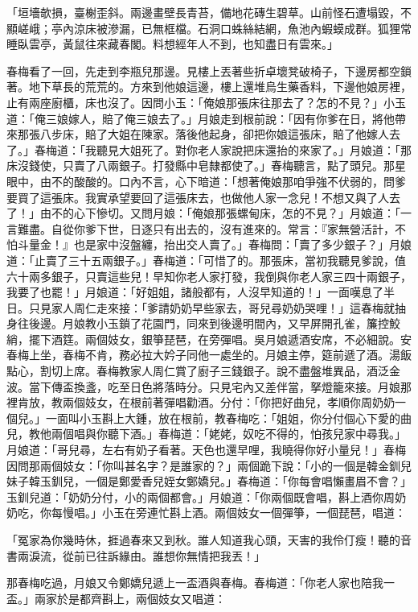 「垣墻欹損，臺榭歪斜。兩邊畫壁長青苔，備地花磚生碧草。山前怪石遭塌毀，不顯嵯峨；亭內涼床被滲漏，已無框檔。石洞口蛛絲結網，魚池內蝦蟆成群。狐狸常睡臥雲亭，黃鼠往來藏春閣。料想經年人不到，也知盡日有雲來。」

春梅看了一回，先走到李瓶兒那邊。見樓上丟著些折卓壞凳破椅子，下邊房都空鎖著。地下草長的荒荒的。方來到他娘這邊，樓上還堆烏生藥香料，下邊他娘房裡，止有兩座廚櫃，床也沒了。因問小玉：「俺娘那張床往那去了？怎的不見？」小玉道：「俺三娘嫁人，賠了俺三娘去了。」月娘走到根前說：「因有你爹在日，將他帶來那張八步床，賠了大姐在陳家。落後他起身，卻把你娘這張床，賠了他嫁人去了。」春梅道：「我聽見大姐死了。對你老人家說把床還抬的來家了。」月娘道：「那床沒錢使，只賣了八兩銀子。打發縣中皂隸都使了。」春梅聽言，點了頭兒。那星眼中，由不的酸酸的。口內不言，心下暗道：「想著俺娘那咱爭強不伏弱的，問爹要買了這張床。我實承望要回了這張床去，也做他人家一念兒！不想又與了人去了！」由不的心下慘切。又問月娘：「俺娘那張螺甸床，怎的不見？」月娘道：「一言難盡。自從你爹下世，日逐只有出去的，沒有進來的。常言：『家無營活計，不怕斗量金！』也是家中沒盤纏，抬出交人賣了。」春梅問：「賣了多少銀子？」月娘道：「止賣了三十五兩銀子。」春梅道：「可惜了的。那張床，當初我聽見爹說，值六十兩多銀子，只賣這些兒！早知你老人家打發，我倒與你老人家三四十兩銀子，我要了也罷！」月娘道：「好姐姐，諸般都有，人沒早知道的！」一面嘆息了半日。只見家人周仁走來接：「爹請奶奶早些家去，哥兒尋奶奶哭哩！」這春梅就抽身往後邊。月娘教小玉鎖了花園門，同來到後邊明間內，又早屏開孔雀，簾控鮫綃，擺下酒筳。兩個妓女，銀箏琵琶，在旁彈唱。吳月娘遞酒安席，不必細說。安春梅上坐，春梅不肯，務必拉大妗子同他一處坐的。月娘主停，筵前遞了酒。湯飯點心，割切上席。春梅教家人周仁賞了廚子三錢銀子。說不盡盤堆異品，酒泛金波。當下傳盃換盞，吃至日色將落時分。只見宅內又差伴當，拏燈籠來接。月娘那裡肯放，教兩個妓女，在根前著彈唱勸酒。分付：「你把好曲兒，孝順你周奶奶一個兒。」一面叫小玉斟上大鍾，放在根前，教春梅吃：「姐姐，你分付個心下愛的曲兒，教他兩個唱與你聽下酒。」春梅道：「姥姥，奴吃不得的，怕孩兒家中尋我。」月娘道：「哥兒尋，左右有奶子看著。天色也還早哩，我曉得你好小量兒！」春梅因問那兩個妓女：「你叫甚名字？是誰家的？」兩個跪下說：「小的一個是韓金釧兒妹子韓玉釧兒，一個是鄭愛香兒姪女鄭嬌兒。」春梅道：「你每會唱懶畫眉不會？」玉釧兒道：「奶奶分付，小的兩個都會。」月娘道：「你兩個既會唱，斟上酒你周奶奶吃，你每慢唱。」小玉在旁連忙斟上酒。兩個妓女一個彈箏，一個琵琶，唱道：

「冤家為你幾時休，捱過春來又到秋。誰人知道我心頭，天害的我伶仃瘦！聽的音書兩淚流，從前已往訴緣由。誰想你無情把我丟！」

那春梅吃過，月娘又令鄭嬌兒遞上一盃酒與春梅。春梅道：「你老人家也陪我一盃。」兩家於是都齊斟上，兩個妓女又唱道：

